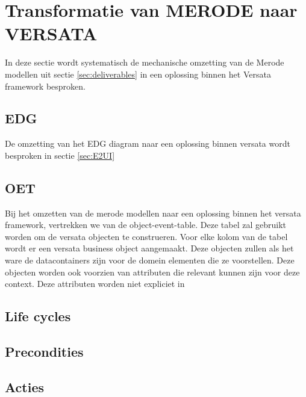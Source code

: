 \section{Transformatie van MERODE naar VERSATA}
\label{sec:mech_transform}
In deze sectie wordt systematisch de mechanische omzetting van de Merode modellen uit sectie \ref{sec:deliverables} in een oplossing binnen het Versata framework besproken.
\subsection{EDG}
De omzetting van het EDG diagram naar een oplossing binnen versata wordt besproken in sectie \ref{sec:E2UI}

\subsection{OET}
\label{sec:OET}
Bij het omzetten van de merode modellen naar een oplossing binnen het versata framework, vertrekken we van de object-event-table. Deze tabel zal gebruikt worden om de versata objecten te construeren.
Voor elke kolom van de tabel wordt er een versata business object aangemaakt. 
Deze objecten zullen als het ware de datacontainers zijn voor de domein elementen die ze voorstellen. Deze objecten worden ook voorzien van attributen die relevant kunnen zijn voor deze context. Deze attributen worden niet expliciet in 
\subsection{Life cycles}
\label{sec:Life_cycles}
\subsection{Precondities}
\label{sec:precondities}
\subsection{Acties}
\label{sec:acties}
